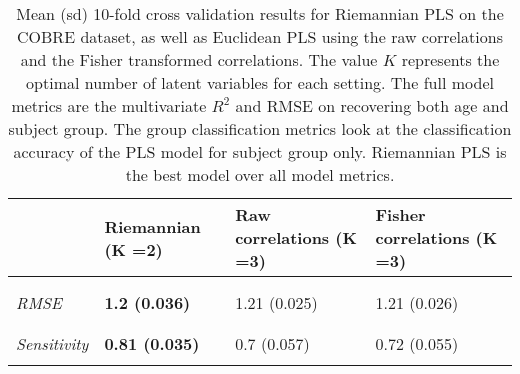 \documentclass[
]{article}
\begin{document}
\begin{table}[htbp]

\caption{\label{tab:cobre_sv_compare}Mean (sd) 10-fold cross validation results for Riemannian PLS on the COBRE dataset, as well as Euclidean PLS using the raw correlations and the Fisher transformed correlations.  The value $K$ represents the optimal number of latent variables for each setting.  The full model metrics are the multivariate $R^2$ and RMSE on recovering both age and subject group.  The group classification metrics look at the classification accuracy of the PLS model for subject group only.  Riemannian PLS is the best model over all model metrics.}
\centering
\begin{tabular}[t]{>{}l|>{}lll}
\toprule
 & Riemannian (K =2) & Raw correlations (K =3) & Fisher correlations (K =3)\\
\midrule
\addlinespace[0.3em]
\multicolumn{4}{l}{\textbf{Full model metrics}}\\
\em{\hspace{1em}\cellcolor{gray!6}{\$R\textasciicircum{}2\$}} & \textbf{\cellcolor{gray!6}{0.25 (0.035)}} & \cellcolor{gray!6}{0.23 (0.033)} & \cellcolor{gray!6}{0.23 (0.036)}\\
\em{\hspace{1em}RMSE} & \textbf{1.2 (0.036)} & 1.21 (0.025) & 1.21 (0.026)\\
\addlinespace[0.3em]
\multicolumn{4}{l}{\textbf{Group classification}}\\
\em{\hspace{1em}\cellcolor{gray!6}{Accuracy}} & \textbf{\cellcolor{gray!6}{0.75 (0.045)}} & \cellcolor{gray!6}{0.73 (0.032)} & \cellcolor{gray!6}{0.74 (0.032)}\\
\em{\hspace{1em}Sensitivity} & \textbf{0.81 (0.035)} & 0.7 (0.057) & 0.72 (0.055)\\
\em{\hspace{1em}\cellcolor{gray!6}{Specificity}} & \textbf{\cellcolor{gray!6}{0.69 (0.071)}} & \cellcolor{gray!6}{0.76 (0.048)} & \cellcolor{gray!6}{0.76 (0.048)}\\
\bottomrule
\end{tabular}
\end{table}
\end{document}
